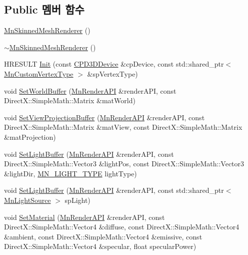 \subsection*{Public 멤버 함수}
\begin{DoxyCompactItemize}
\item 
\hyperlink{class_m_n_l_1_1_mn_skinned_mesh_renderer_ab07b27240a1ed3fed65638b0c8747249}{Mn\+Skinned\+Mesh\+Renderer} ()
\item 
\hyperlink{class_m_n_l_1_1_mn_skinned_mesh_renderer_a74f1c5392a3c9f7a8aaddc9174fd6434}{$\sim$\+Mn\+Skinned\+Mesh\+Renderer} ()
\item 
H\+R\+E\+S\+U\+LT \hyperlink{class_m_n_l_1_1_mn_skinned_mesh_renderer_ac359436e68b305a342e34d400a496802}{Init} (const \hyperlink{namespace_m_n_l_a1eec210db8f309a4a9ac0d9658784c31}{C\+P\+D3\+D\+Device} \&cp\+Device, const std\+::shared\+\_\+ptr$<$ \hyperlink{class_m_n_l_1_1_mn_custom_vertex_type}{Mn\+Custom\+Vertex\+Type} $>$ \&sp\+Vertex\+Type)
\item 
void \hyperlink{class_m_n_l_1_1_mn_skinned_mesh_renderer_a68ee7deacb177b3fe1c40ef6c54656ad}{Set\+World\+Buffer} (\hyperlink{class_m_n_l_1_1_mn_render_a_p_i}{Mn\+Render\+A\+PI} \&render\+A\+PI, const Direct\+X\+::\+Simple\+Math\+::\+Matrix \&mat\+World)
\item 
void \hyperlink{class_m_n_l_1_1_mn_skinned_mesh_renderer_a37ec060d1a3f351868732fc76ae07200}{Set\+View\+Projection\+Buffer} (\hyperlink{class_m_n_l_1_1_mn_render_a_p_i}{Mn\+Render\+A\+PI} \&render\+A\+PI, const Direct\+X\+::\+Simple\+Math\+::\+Matrix \&mat\+View, const Direct\+X\+::\+Simple\+Math\+::\+Matrix \&mat\+Projection)
\item 
void \hyperlink{class_m_n_l_1_1_mn_skinned_mesh_renderer_a8041d4a0af22d9494bad1cb83e0584cb}{Set\+Light\+Buffer} (\hyperlink{class_m_n_l_1_1_mn_render_a_p_i}{Mn\+Render\+A\+PI} \&render\+A\+PI, const Direct\+X\+::\+Simple\+Math\+::\+Vector3 \&light\+Pos, const Direct\+X\+::\+Simple\+Math\+::\+Vector3 \&light\+Dir, \hyperlink{namespace_m_n_l_aac0b78de8bb8c872cb617ede813c113d}{M\+N\+\_\+\+L\+I\+G\+H\+T\+\_\+\+T\+Y\+PE} light\+Type)
\item 
void \hyperlink{class_m_n_l_1_1_mn_skinned_mesh_renderer_a7ff99b167cb891b1cf9b8dd68b45851f}{Set\+Light\+Buffer} (\hyperlink{class_m_n_l_1_1_mn_render_a_p_i}{Mn\+Render\+A\+PI} \&render\+A\+PI, const std\+::shared\+\_\+ptr$<$ \hyperlink{class_m_n_l_1_1_mn_light_source}{Mn\+Light\+Source} $>$ sp\+Light)
\item 
void \hyperlink{class_m_n_l_1_1_mn_skinned_mesh_renderer_aa8722f1774464897eabece8d0c5bfa8f}{Set\+Material} (\hyperlink{class_m_n_l_1_1_mn_render_a_p_i}{Mn\+Render\+A\+PI} \&render\+A\+PI, const Direct\+X\+::\+Simple\+Math\+::\+Vector4 \&diffuse, const Direct\+X\+::\+Simple\+Math\+::\+Vector4 \&ambient, const Direct\+X\+::\+Simple\+Math\+::\+Vector4 \&emissive, const Direct\+X\+::\+Simple\+Math\+::\+Vector4 \&specular, float specular\+Power)

\end{DoxyCompactItemize}
